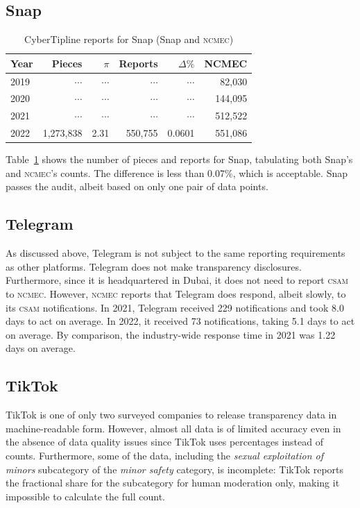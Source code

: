 \documentclass[nonacm,screen]{acmart}
\newcommand\V[1]{\textsc{\MakeLowercase{#1}}}
\begin{document}
\subsection{Snap}

\begin{table}[h!]
\centering\libertineLF
\caption{CyberTipline reports for Snap (Snap and \V{NCMEC})}
\label{tab:snap}
\begin{tabular}{l|rr|rrr}
\textbf{Year}
& \textbf{Pieces} & \textbf{$\pi$} & \textbf{Reports}
& \textbf{$\Delta\%$} & \textbf{NCMEC} \\ \hline
2019 & $\cdots$ & $\cdots$ & $\cdots$ & $\cdots$ & 82,030 \\
2020 & $\cdots$ & $\cdots$ & $\cdots$ & $\cdots$ & 144,095 \\
2021 & $\cdots$ & $\cdots$ & $\cdots$ & $\cdots$ & 512,522 \\
2022 & 1,273,838 & 2.31 & 550,755 & 0.0601 & 551,086 \\
\end{tabular}
\end{table}

\noindent{}Table~\ref{tab:snap} shows the number of pieces and reports for Snap,
tabulating both Snap's and \V{NCMEC}'s counts. The difference is less than
0.07\%, which is acceptable. Snap passes the audit, albeit based on only one
pair of data points.


\subsection{Telegram}

As discussed above, Telegram is not subject to the same reporting requirements
as other platforms. Telegram does not make transparency disclosures.
Furthermore, since it is headquartered in Dubai, it does not need to report
\V{CSAM} to \V{NCMEC}. However, \V{NCMEC} reports that Telegram does respond,
albeit slowly, to its \V{CSAM} notifications. In 2021, Telegram received 229
notifications and took 8.0 days to act on average. In 2022, it received 73
notifications, taking 5.1 days to act on average. By comparison, the
industry-wide response time in 2021 was 1.22 days on average.


\subsection{TikTok}

TikTok is one of only two surveyed companies to release transparency data in
machine-readable form. However, almost all data is of limited accuracy even in
the absence of data quality issues since TikTok uses percentages instead of
counts. Furthermore, some of the data, including the \emph{sexual exploitation
of minors} subcategory of the \emph{minor safety} category, is incomplete:
TikTok reports the fractional share for the subcategory for human moderation
only, making it impossible to calculate the full count.
\end{document}
